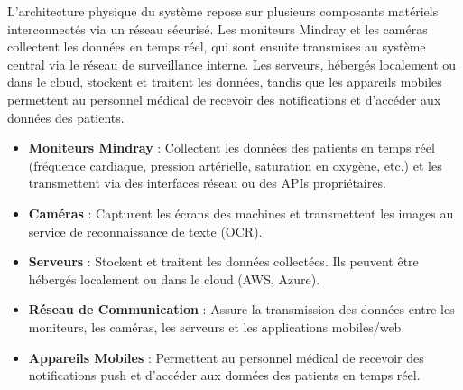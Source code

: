 L’architecture physique du système repose sur plusieurs composants matériels interconnectés via un réseau sécurisé. Les moniteurs Mindray et les caméras collectent les données en temps réel, qui sont ensuite transmises au système central via le réseau de surveillance interne. Les serveurs, hébergés localement ou dans le cloud, stockent et traitent les données, tandis que les appareils mobiles permettent au personnel médical de recevoir des notifications et d’accéder aux données des patients.

\begin{itemize}
    \item \textbf{Moniteurs Mindray} : Collectent les données des patients en temps réel (fréquence cardiaque, pression artérielle, saturation en oxygène, etc.) et les transmettent via des interfaces réseau ou des APIs propriétaires.
    \item \textbf{Caméras} : Capturent les écrans des machines et transmettent les images au service de reconnaissance de texte (OCR).
    \item \textbf{Serveurs} : Stockent et traitent les données collectées. Ils peuvent être hébergés localement ou dans le cloud (AWS, Azure).
    \item \textbf{Réseau de Communication} : Assure la transmission des données entre les moniteurs, les caméras, les serveurs et les applications mobiles/web.
    \item \textbf{Appareils Mobiles} : Permettent au personnel médical de recevoir des notifications push et d’accéder aux données des patients en temps réel.
\end{itemize}
